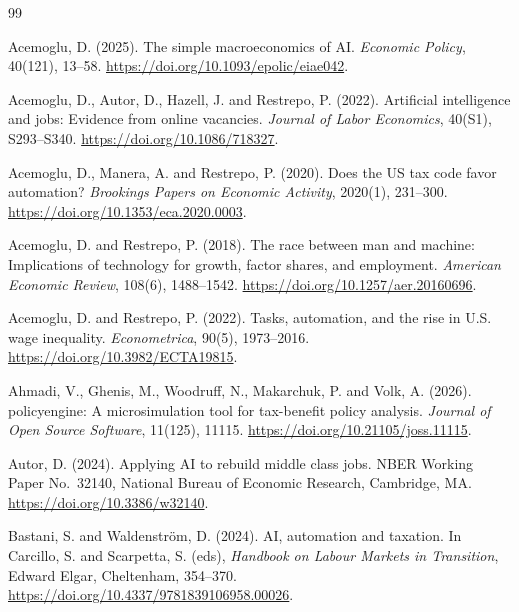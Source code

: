 \begin{thebibliography}{99}

Acemoglu, D. (2025).
\newblock The simple macroeconomics of AI.
\newblock \emph{Economic Policy}, 40(121), 13--58.
\newblock \url{https://doi.org/10.1093/epolic/eiae042}.

Acemoglu, D., Autor, D., Hazell, J. and Restrepo, P. (2022).
\newblock Artificial intelligence and jobs: Evidence from online vacancies.
\newblock \emph{Journal of Labor Economics}, 40(S1), S293--S340.
\newblock \url{https://doi.org/10.1086/718327}.

Acemoglu, D., Manera, A. and Restrepo, P. (2020).
\newblock Does the US tax code favor automation?
\newblock \emph{Brookings Papers on Economic Activity}, 2020(1), 231--300.
\newblock \url{https://doi.org/10.1353/eca.2020.0003}.

Acemoglu, D. and Restrepo, P. (2018).
\newblock The race between man and machine: Implications of technology for growth, factor shares, and employment.
\newblock \emph{American Economic Review}, 108(6), 1488--1542.
\newblock \url{https://doi.org/10.1257/aer.20160696}.

Acemoglu, D. and Restrepo, P. (2022).
\newblock Tasks, automation, and the rise in U.S. wage inequality.
\newblock \emph{Econometrica}, 90(5), 1973--2016.
\newblock \url{https://doi.org/10.3982/ECTA19815}.

Ahmadi, V., Ghenis, M., Woodruff, N., Makarchuk, P. and Volk, A. (2026).
\newblock policyengine: A microsimulation tool for tax-benefit policy analysis.
\newblock \emph{Journal of Open Source Software}, 11(125), 11115.
\newblock \url{https://doi.org/10.21105/joss.11115}.

Autor, D. (2024).
\newblock Applying AI to rebuild middle class jobs.
\newblock NBER Working Paper No.~32140, National Bureau of Economic Research, Cambridge, MA.
\newblock \url{https://doi.org/10.3386/w32140}.

Bastani, S. and Waldenstr\"{o}m, D. (2024).
\newblock AI, automation and taxation.
\newblock In Carcillo, S. and Scarpetta, S. (eds), \emph{Handbook on Labour Markets in Transition}, Edward Elgar, Cheltenham, 354--370.
\newblock \url{https://doi.org/10.4337/9781839106958.00026}.


\end{thebibliography}
